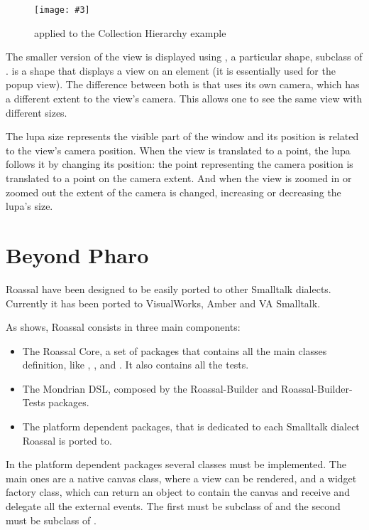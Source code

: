 \documentclass[a4paper,10pt,twoside]{book}
\newcommand{\fig}[4]{
		\begin{figure}[#1]
			\centering
			\texttt{[image: \#3]}
			\caption{\label{fig:#3}#4}
		\end{figure}}
\begin{document}
\fig{H}{0.9}{miniMap}{ applied to the Collection Hierarchy example}

The smaller version of the view is displayed using , a particular shape, subclass of . 
 is a shape that displays a view on an element (it is essentially used for the popup view). The difference between both is that  uses its own camera, which has a different extent to the view's camera. This allows one to see the same view with different sizes. 

The lupa size represents the visible part of the window and its position is related to the view's camera position. When the view is translated to a point, the lupa follows it by changing its position: the point representing the camera position is translated to a point on the  camera extent. And when the view is zoomed in or zoomed out the extent of the camera is changed, increasing or decreasing the lupa's size.




\section{Beyond Pharo}

Roassal have been designed to be easily ported to other Smalltalk dialects. Currently it has been ported to VisualWorks, Amber and VA Smalltalk.

As  shows, Roassal consists in three main components:

\begin{itemize}
\item  The Roassal Core, a set of packages that contains all the main classes definition, like , ,  and . It also contains all the tests.
\item The Mondrian DSL, composed by the Roassal-Builder and Roassal-Builder-Tests packages.
\item The platform dependent packages, that is dedicated to each Smalltalk dialect Roassal is ported to.
\end{itemize} 


In the platform dependent packages several classes must be implemented. The main ones are a native canvas class, where a view can be rendered, and a widget factory class, which can return an object to contain the canvas and receive and delegate all the external events.
The first must be subclass of  and the second must be subclass of .
\end{document}
